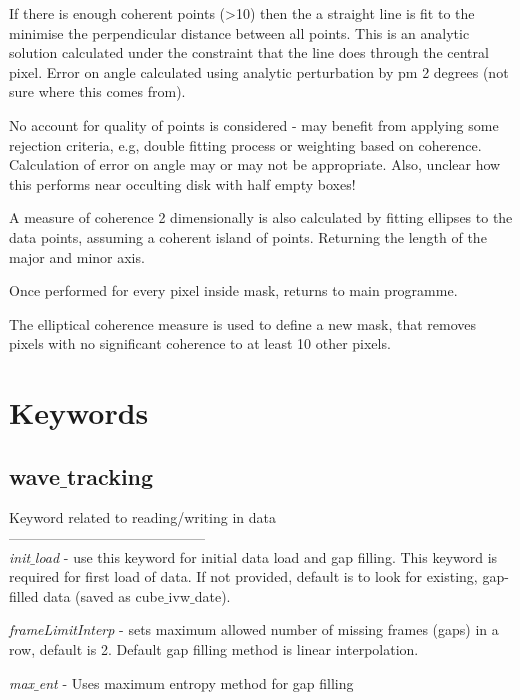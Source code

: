 \documentclass{article}
\begin{document}
If there is enough coherent points (>10) then the 
a straight line is fit to the minimise the perpendicular distance between all points. This is an analytic solution calculated under the constraint that the line does through the central pixel. Error on angle
calculated using analytic perturbation by pm 2 degrees (not sure where this comes from).

No account for quality of points is considered - may benefit from applying some rejection criteria, e.g, double fitting process or weighting based on coherence. Calculation of error on angle may or may not be appropriate. Also, unclear how this performs near occulting disk with half empty boxes!

A measure of coherence 2 dimensionally is also calculated by fitting ellipses to the data points, assuming a coherent island of points. Returning the length of the major and minor axis.

Once performed for every pixel inside mask, returns to main programme.

The elliptical coherence measure is used to define a new mask, that removes pixels with no significant coherence to at least 10 other pixels.


\section{Keywords}
\subsection{wave$\_$tracking}
Keyword related to reading/writing in data\\
------------------------------------------\\
\textit{init$\_$load}       - use this keyword for initial data load and gap filling.
                  This keyword is required for first load of data. If not provided,
                  default is to look for existing, gap-filled data (saved as cube$\_$ivw$\_$date).\\
\smallskip

\textit{frameLimitInterp} - sets maximum allowed number of missing frames (gaps) in a row, default is 2.
                   Default gap filling method is linear interpolation.\\
\smallskip             

\textit{max$\_$ent}         - Uses maximum entropy method for gap filling\\
\smallskip
\end{document}
